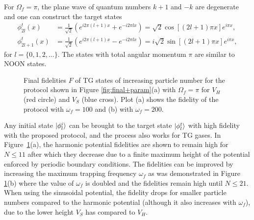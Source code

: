 For $\Omega_f=\pi$, the plane wave of quantum numbers $k+1$ and $-k$ are degenerate and one can construct the target states
\begin{align}
\phi^t_{2l}(x)&=\frac{1}{\sqrt 2} \left( e^{i 2 \pi (l+1) x} + e^{-i 2 \pi l x} \right) = \sqrt{2} \cos[(2l+1) \pi x] e^{i \pi x} , \\
\phi^t_{2l+1}(x)&=\frac{1}{\sqrt 2} \left( e^{i 2 \pi (l+1) x}-e^{-i 2 \pi l x} \right) = i \sqrt{2} \sin[(2l+1) \pi x]e^{i \pi x} ,
\end{align}
for $l=\{0,1,2,\ldots\}$.
The states with total angular momentum $\pi$ are similar to NOON states.

\begin{figure}
\centering
{}
\caption{ Final fidelities $F$ of TG states of increasing particle number for the protocol shown in Figure \ref{fig:final+param}(a) with $\Omega_f = \pi$ for $V_H$ (red circle) and $V_S$ (blue cross). Plot (a) shows the fidelity of the protocol with $\omega_f = 100$ and (b) with $\omega_f = 200$.}
\label{fig:TG-STA}
\end{figure}

Any initial state $\ket{\phi^i_l}$ can be brought to the target state $\ket{\phi^t_l}$ with high fidelity with the proposed protocol, and the process also works for TG gases.
In Figure~\ref{fig:TG-STA}(a), the harmonic potential fidelities are shown to remain high for $N \leq 11$ after which they decrease due to a finite maximum height of the potential enforced by periodic boundary conditions.
The fidelities can be improved by increasing the maximum trapping frequency $\omega_f$ as was demonstrated in Figure \ref{fig:TG-STA}(b) where the value of $\omega_f$ is doubled and the fidelities remain high until $N \leq 21$.
When using the sinusoidal potential, the fidelity drops for smaller particle numbers compared to the  harmonic potential (although it also increases with $\omega_f$), due to the lower height $V_S$ has compared to $V_H$.

